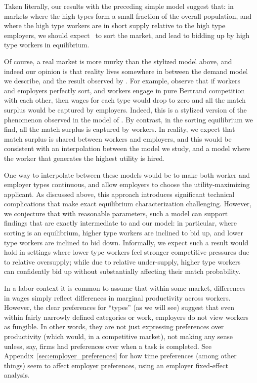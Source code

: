 Taken literally, our results with the preceding simple model suggest that: in markets where the high types form a small fraction of the overall population, and where the high type workers are in short supply relative to the high type employers, we should expect \hottowel~to sort the market, and lead to bidding up by high type workers in equilibrium.

Of course, a real market is more murky than the stylized model above, and indeed our opinion is that reality lives somewhere in between the demand model we describe, and the result observed by \cite{tadelis2011information}.
For example, observe that if workers and employers perfectly sort, and workers engage in pure Bertrand competition with each other, then wages for each type would drop to zero and all the match surplus would be captured by employers.
Indeed, this is a stylized version of the phenomenon observed in the model of \cite{tadelis2011information}.
By contrast, in the sorting equilibrium we find, all the match surplus is captured by workers.
In reality, we expect that match surplus is shared between workers and employers, and this would be consistent with an interpolation between the model we study, and a model where the worker that generates the highest utility is hired.

One way to interpolate between these models would be to make both worker and employer types continuous, and allow employers to choose the utility-maximizing applicant.
As discussed above, this approach introduces significant technical complications that make exact equilibrium characterization challenging.
However, we conjecture that with reasonable parameters, such a model can support findings that are exactly intermediate to \cite{tadelis2011information} and our model:
in particular, where sorting is an equilibrium, higher type workers are inclined to bid up, and lower type workers are inclined to bid down.
Informally, we expect such a result would hold in settings where lower type workers feel stronger competitive pressures due to relative oversupply; while due to relative under-supply, higher type workers can confidently bid up without substantially affecting their match probability.

In a labor context it is common to assume that within some market, differences in wages simply reflect differences in marginal productivity across workers.
However, the clear preferences for ``types'' (as we will see) suggest that even within fairly narrowly defined categories or work, employers do not view workers as fungible.
In other words, they are not just expressing preferences over productivity (which would, in a competitive market), not making any sense unless, say, firms had preferences over when a task is completed.
See Appendix~\ref{sec:employer_preferences} for how time preferences (among other things) seem to affect employer preferences, using an employer fixed-effect analysis. 


